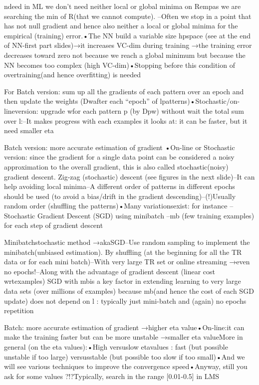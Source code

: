 ndeed in ML we don’t need neither local or global minima on Rempas we are searching the min of R(that we cannot compute). –Often we stop in a point that has not null gradient and hence also  neither a local or global minima for the empirical (training) error.•The NN build a variable size hpspace (see at the end of NN-first part slides)→it increases VC-dim during training →the training  error decreases toward zero not because we reach a global minimum but because the NN becomes too complex (high VC-dim)•Stopping before this condition of overtraining(and hence overfitting) is needed

For Batch version: sum up all the gradients of each pattern over an epoch and then update the weights (Dwafter each “epoch” of lpatterns)•Stochastic/on-lineversion: upgrade wfor each pattern p (by Dpw)  without wait the total sum over l:–It makes progress with each examples it looks at: it can be faster, but it need smaller eta

Batch version: more accurate estimation of gradient •On-line or Stochastic version:  since the gradient for a single data point can be considered a noisy approximation to the overall gradient, this is also called stochastic(noisy) gradient descent. Zig-zag (stochastic) descent (see figures in the next slide)–It can help avoiding local minima–A different order of patterns in different epochs should be used  (to avoid a bias/drift in the gradient descending)–(!)Usually random order (shuffling the patterns)•Many variationsexist: for instance –Stochastic Gradient Descent (SGD) using minibatch –mb (few training examples) for each step of gradient descent

Minibatchstochastic method →akaSGD–Use random sampling to implement the minibatch(unbiased estimation). By shuffling  (at the beginning for all the TR data or for each mini batch)–With very large TR set or online streaming →even no epochs!–Along with the advantage of gradient descent (linear cost wrtexamples) SGD with mbis a key factor in extending learning to very large data sets (over millions of examples) because mb(and hence the cost of each SGD update) does not depend on l : typically just mini-batch  and  (again) no epochs repetition

Batch: more accurate estimation of gradient →higher eta value•On-line:it can make the training faster but can be more unstable →smaller eta valueMore in general (on the eta values):•High versuslow etavalues :  fast (but possible unstable if too large) versusstable (but possible too slow if too small)•And we will see various techniques to improve the convergence speed•Anyway, still you ask for some values ?!?Typically, search in the range [0.01-0.5] in LMS

